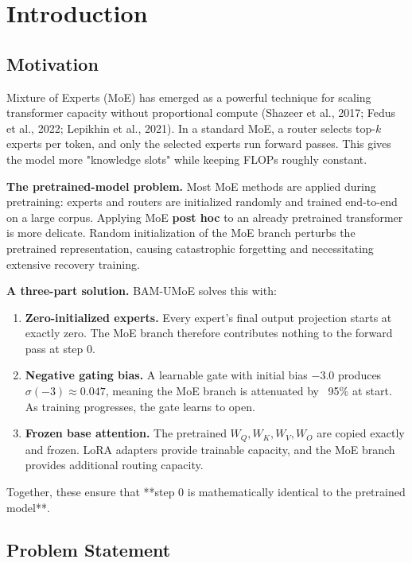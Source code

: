 \section{Introduction}

\subsection{Motivation}

Mixture of Experts (MoE) has emerged as a powerful technique for scaling 
transformer capacity without proportional compute (Shazeer et al., 2017; 
Fedus et al., 2022; Lepikhin et al., 2021). In a standard MoE, a router 
selects top-$k$ experts per token, and only the selected experts run forward 
passes. This gives the model more "knowledge slots" while keeping FLOPs 
roughly constant.

\textbf{The pretrained-model problem.} Most MoE methods are applied during 
pretraining: experts and routers are initialized randomly and trained 
end-to-end on a large corpus. Applying MoE \textbf{post hoc} to an already 
pretrained transformer is more delicate. Random initialization of the MoE 
branch perturbs the pretrained representation, causing catastrophic 
forgetting and necessitating extensive recovery training.

\textbf{A three-part solution.} BAM-UMoE solves this with:

\begin{enumerate}
\item \textbf{Zero-initialized experts.} Every expert's final output projection
  starts at exactly zero. The MoE branch therefore contributes nothing
  to the forward pass at step 0.

\item \textbf{Negative gating bias.} A learnable gate with initial bias $-3.0$
  produces $\sigma(-3) \approx 0.047$, meaning the MoE branch is attenuated
  by ~95\% at start. As training progresses, the gate learns to open.

\item \textbf{Frozen base attention.} The pretrained $W_Q, W_K, W_V, W_O$ are copied
  exactly and frozen. LoRA adapters provide trainable capacity, and the MoE
  branch provides additional routing capacity.

\end{enumerate}
Together, these ensure that **step 0 is mathematically identical to the 
pretrained model**.

\subsection{Problem Statement}

